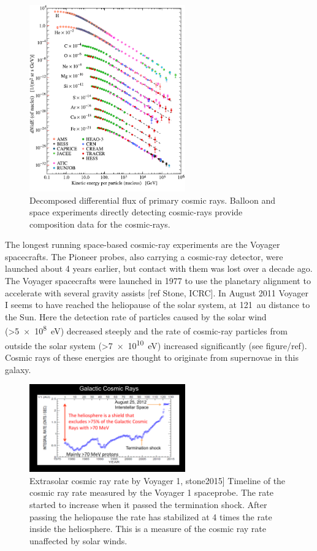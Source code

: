 \begin{figure}
    \centering
    \includegraphics[width=0.6\textwidth]
                    {plots/cosmic-rays/PDG_28_1_fluxes_per_nucleus.pdf}
    \caption{Decomposed differential flux of primary cosmic rays. Balloon and space experiments directly detecting cosmic-rays provide composition data for the cosmic-rays.}
    \label{fig:PDG_28_1_fluxes_per_nucleus}
\end{figure}

The longest running space-based cosmic-ray experiments are the Voyager spacecrafts. The Pioneer probes, also carrying a cosmic-ray detector, were launched about 4 years earlier, but contact with them was lost over a decade ago. The Voyager spacecrafts were launched in 1977 to use the planetary alignment to accelerate with several gravity assists [ref Stone, ICRC]. In August 2011 Voyager I seems to have reached the heliopause of the solar system, at \SI{121}{\astronomicalunit} distance to the Sun. Here the detection rate of particles caused by the solar wind (>\SI{5e8}{\eV}) decreased steeply and the rate of cosmic-ray particles from outside the solar system (>\SI{7e10}{\eV}) increased significantly (see figure/ref). Cosmic rays of these energies are thought to originate from supernovae in this galaxy.

\begin{figure}
    \centering
    \includegraphics[width=0.6\textwidth]
                    {plots/cosmic-rays/voyager_heliosphere}
    \caption{Extrasolar cosmic ray rate by Voyager 1, stone2015]
Timeline of the cosmic ray rate measured by the Voyager 1 spaceprobe. The rate started to increase when it passed the termination shock. After passing the heliopause the rate has stabilized at 4 times the rate inside the heliosphere. This is a measure of the cosmic ray rate unaffected by solar winds.}
    \label{fig:voyager_heliosphere}
\end{figure}


